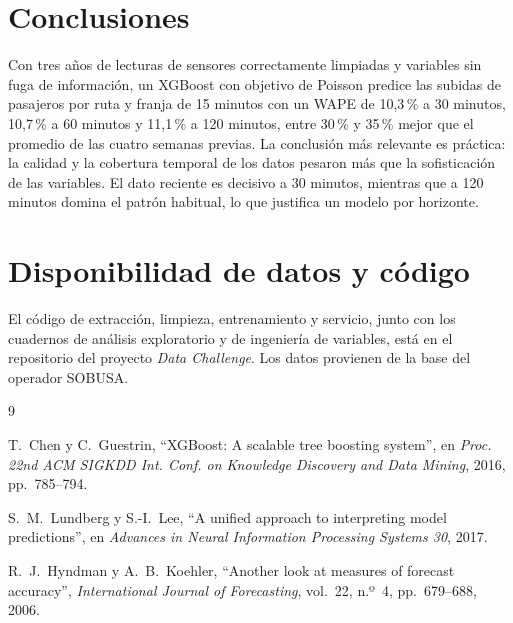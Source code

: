 \documentclass[11pt,a4paper]{article}
\begin{document}
\section{Conclusiones}

Con tres años de lecturas de sensores correctamente limpiadas y variables sin fuga de información, un XGBoost con objetivo de Poisson predice las subidas de pasajeros por ruta y franja de 15 minutos con un WAPE de 10,3\,\% a 30 minutos, 10,7\,\% a 60 minutos y 11,1\,\% a 120 minutos, entre 30\,\% y 35\,\% mejor que el promedio de las cuatro semanas previas. La conclusión más relevante es práctica: la calidad y la cobertura temporal de los datos pesaron más que la sofisticación de las variables. El dato reciente es decisivo a 30 minutos, mientras que a 120 minutos domina el patrón habitual, lo que justifica un modelo por horizonte.

\section*{Disponibilidad de datos y código}

El código de extracción, limpieza, entrenamiento y servicio, junto con los cuadernos de análisis exploratorio y de ingeniería de variables, está en el repositorio del proyecto \emph{Data Challenge}. Los datos provienen de la base del operador SOBUSA.

\begin{thebibliography}{9}

T.~Chen y C.~Guestrin,
``XGBoost: A scalable tree boosting system'',
en \emph{Proc. 22nd ACM SIGKDD Int. Conf. on Knowledge Discovery and Data Mining}, 2016, pp.~785--794.

S.~M.~Lundberg y S.-I.~Lee,
``A unified approach to interpreting model predictions'',
en \emph{Advances in Neural Information Processing Systems 30}, 2017.

R.~J.~Hyndman y A.~B.~Koehler,
``Another look at measures of forecast accuracy'',
\emph{International Journal of Forecasting}, vol.~22, n.º~4, pp.~679--688, 2006.

\end{thebibliography}
\end{document}
